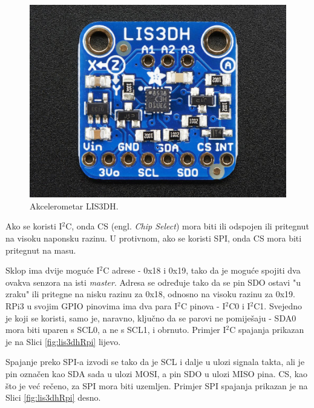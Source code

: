 \documentclass[12pt,a4paper]{article}
\begin{document}
		\begin{figure}[h!]
			\includegraphics[width=\linewidth]{slike/lis3dh.jpg}
			\caption{Akcelerometar LIS3DH.\cite{lis3dh}}
			\label{fig:lis3dh}
		\end{figure}

		\par Ako se koristi I$^2$C, onda CS (engl. \textit{Chip Select}) mora biti ili odspojen ili pritegnut na visoku naponsku razinu. U protivnom, ako se koristi SPI, onda CS mora biti pritegnut na masu.

		\par Sklop ima dvije moguće I$^2$C adrese - 0x18 i 0x19, tako da je moguće spojiti dva ovakva senzora na isti \textit{master}. Adresa se određuje tako da se pin SDO ostavi "u zraku" ili pritegne na nisku razinu za 0x18, odnosno na visoku razinu za 0x19. \\
		RPi3 u svojim GPIO pinovima ima dva para I$^2$C pinova - I$^2$C0 i I$^2$C1. Svejedno je koji se koristi, samo je, naravno, ključno da se parovi ne pomiješaju - SDA0 mora biti uparen s SCL0, a ne s SCL1, i obrnuto. Primjer I$^2$C spajanja prikazan je na Slici \ref{fig:lis3dhRpi} lijevo.

		\par Spajanje preko SPI-a izvodi se tako da je SCL i dalje u ulozi signala takta, ali je pin označen kao SDA sada u ulozi MOSI, a pin SDO u ulozi MISO pina. CS, kao što je već rečeno, za SPI mora biti uzemljen. Primjer SPI spajanja prikazan je na Slici \ref{fig:lis3dhRpi} desno.
\end{document}
